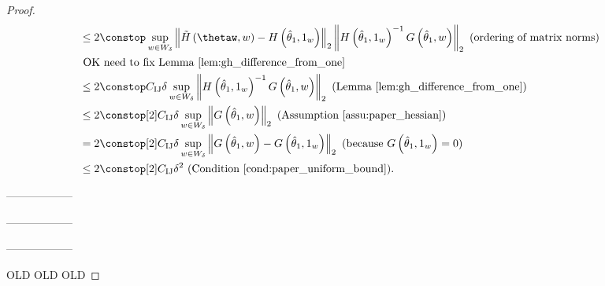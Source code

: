 \begin{proof}
\begin{align*}
 & \le2\constop\sup_{w\in W_{\delta}}\norm{
    \hint\left(\thetaw,w\right) -
    H\left(\thetaone,\onevec\right)}_{2}
    \norm{H\left(\thetaone,\onevec\right)^{-1}G\left(\thetaone,w\right)}_{2}
    \textrm{ (ordering of matrix norms)}\\
 & \textrm{ OK need to fix Lemma \ref{lem:gh_difference_from_one}} &\\
 & \le2\constop\constij\delta\sup_{w\in W_{\delta}}\norm{H\left(\thetaone,\onevec\right)^{-1}G\left(\thetaone,w\right)}_{2}\textrm{ (Lemma \ref{lem:gh_difference_from_one})}\\
 & \le2\constop[2]\constij\delta\sup_{w\in W_{\delta}}\norm{G\left(\thetaone,w\right)}_{2}\textrm{ (Assumption \ref{assu:paper_hessian})}\\
 & =2\constop[2]\constij\delta\sup_{w\in W_{\delta}}\norm{G\left(\thetaone,w\right)-G\left(\thetaone,\onevec\right)}_{2}\textrm{ (because }G\left(\thetaone,\onevec\right)=0\textrm{)}\\
 & \le2\constop[2]\constij\delta^{2}\textrm{ (Condition \ref{cond:paper_uniform_bound})}.
\end{align*}



------------------

------------------

------------------

OLD OLD OLD



\end{proof}
